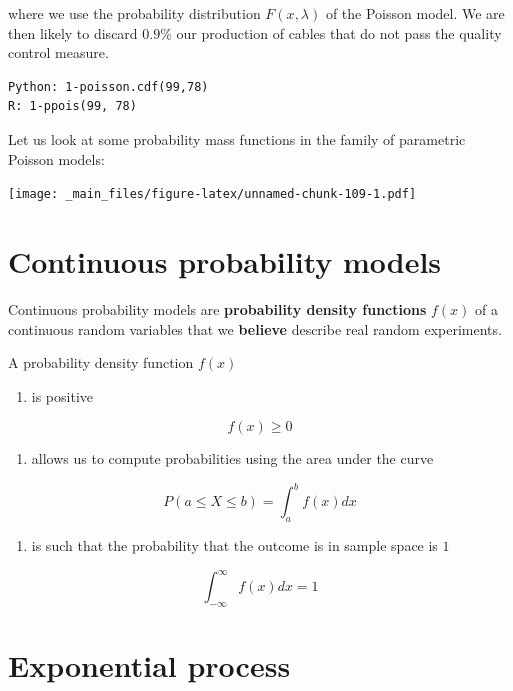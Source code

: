 \documentclass[
]{book}
\providecommand{\tightlist}{%
  \setlength{\itemsep}{0pt}\setlength{\parskip}{0pt}}
\begin{document}
where we use the probability distribution \(F(x,\lambda)\) of the Poisson model. We are then likely to discard \(0.9\%\) our production of cables that do not pass the quality control measure.

\begin{verbatim}
Python: 1-poisson.cdf(99,78)
R: 1-ppois(99, 78)
\end{verbatim}

Let us look at some probability mass functions in the family of parametric Poisson models:

\texttt{[image: \_main\_files/figure-latex/unnamed-chunk-109-1.pdf]}

\hypertarget{continuous-probability-models}{%
\section{Continuous probability models}\label{continuous-probability-models}}

Continuous probability models are \textbf{probability density functions} \(f(x)\) of a continuous random variables that we \textbf{believe} describe real random experiments.

A probability density function \(f(x)\)

\begin{enumerate}
\def\labelenumi{\arabic{enumi})}
\tightlist
\item
  is positive
\end{enumerate}

\[f(x) \geq 0\]

\begin{enumerate}
\def\labelenumi{\arabic{enumi})}
\setcounter{enumi}{1}
\tightlist
\item
  allows us to compute probabilities using the area under the curve
\end{enumerate}

\[P(a\leq X \leq b)=\int_{a}^{b} f(x) dx\]

\begin{enumerate}
\def\labelenumi{\arabic{enumi})}
\setcounter{enumi}{2}
\tightlist
\item
  is such that the probability that the outcome is in sample space is \(1\)
\end{enumerate}

\[\int_{-\infty}^{\infty} f(x) dx = 1\]

\hypertarget{exponential-process}{%
\section{Exponential process}\label{exponential-process}}
\end{document}
